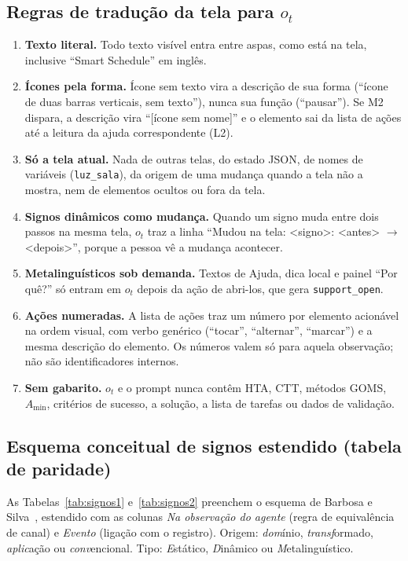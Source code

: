 \documentclass[conference,onecolumn]{IEEEtran}
\newcommand{\ev}[1]{\texttt{#1}}
\begin{document}
\subsection{Regras de tradução da tela para $o_t$}
\begin{enumerate}
\item \textbf{Texto literal.} Todo texto visível entra entre aspas, como está na tela, inclusive ``Smart Schedule'' em inglês.
\item \textbf{Ícones pela forma.} Ícone sem texto vira a descrição de sua forma (``ícone de duas barras verticais, sem texto''), nunca sua função (``pausar''). Se M2 dispara, a descrição vira ``[ícone sem nome]'' e o elemento sai da lista de ações até a leitura da ajuda correspondente (L2).
\item \textbf{Só a tela atual.} Nada de outras telas, do estado JSON, de nomes de variáveis (\texttt{luz\_sala}), da origem de uma mudança quando a tela não a mostra, nem de elementos ocultos ou fora da tela.
\item \textbf{Signos dinâmicos como mudança.} Quando um signo muda entre dois passos na mesma tela, $o_t$ traz a linha ``Mudou na tela: <signo>: <antes> $\rightarrow$ <depois>'', porque a pessoa vê a mudança acontecer.
\item \textbf{Metalinguísticos sob demanda.} Textos de Ajuda, dica local e painel ``Por quê?'' só entram em $o_t$ depois da ação de abri-los, que gera \ev{support\_open}.
\item \textbf{Ações numeradas.} A lista de ações traz um número por elemento acionável na ordem visual, com verbo genérico (``tocar'', ``alternar'', ``marcar'') e a mesma descrição do elemento. Os números valem só para aquela observação; não são identificadores internos.
\item \textbf{Sem gabarito.} $o_t$ e o prompt nunca contêm HTA, CTT, métodos GOMS, $A_{\min}$, critérios de sucesso, a solução, a lista de tarefas ou dados de validação.
\end{enumerate}

\subsection{Esquema conceitual de signos estendido (tabela de paridade)}
As Tabelas~\ref{tab:signos1} e~\ref{tab:signos2} preenchem o esquema de Barbosa e Silva~\cite{barbosa2010}, estendido com as colunas \textit{Na observação do agente} (regra de equivalência de canal) e \textit{Evento} (ligação com o registro). Origem: \textit{dom}ínio, \textit{transf}ormado, \textit{aplic}ação ou \textit{conv}encional. Tipo: \textit{E}stático, \textit{D}inâmico ou \textit{M}etalinguístico.
\end{document}
